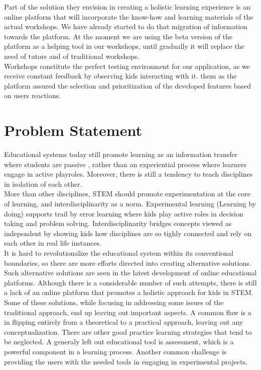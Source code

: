 Part of the solution they envision in creating a holistic learning experience is an online platform that will incorporate the know-how and learning materials of the actual workshops. We have already started to do that migration of information towards the platform. At the moment we are using the beta version of the platform as a helping tool in our workshops, until gradually it will replace the need of tutors and of traditional workshops. \\

Workshops constitute the perfect testing environment for our application, as we receive constant feedback by observing kids interacting with it.  them as  the platform assured the selection and prioritization of the developed features based on users reactions.


\section{Problem Statement}

Educational systems today still promote learning as an information transfer where students are passive , rather than an experiential process where learners engage in active playroles. Moreover, there is still a tendency to teach disciplines in isolation of each other. \\

More than other disciplines, STEM should promote experimentation at the core of learning, and interdisciplinarity as a norm. Experimental learning (Learning by doing) supports trail by error learning where kids play active roles in decision taking and problem solving. Interdisciplinarity bridges concepts viewed as independent by showing kids how disciplines are so tighly connected and rely on each other in real life instances. \\

It is hard to revolutionalize the educational system within its conventional boundaries, so there are more efforts directed into creating alternative solutions. Such alternative solutions are seen in the latest development of online educational platforms. Although there is a considerable number of such attempts, there is still a lack of an online platform that promotes a holistic approach for kids in STEM. \\

Some of these solutions, while focusing in addressing some issues of the traditional approach, end up leaving out important aspects. A common flaw is a  in flipping entirely from a theoretical to a practical approach, leaving out any conceptualization. 
There are other good practice learning strategies that tend to be neglected. A generaly left out educational tool is assessment, which is a powerful component in a learning process.
Another common challenge is providing the users with the needed tools in engaging in experimental projects. \\

